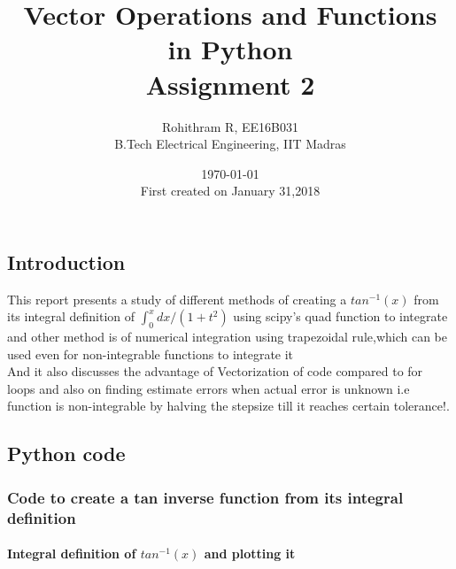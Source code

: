 \documentclass[a4paper]{report}
\title{Vector Operations and Functions in Python \\ Assignment 2}
\author{Rohithram R, EE16B031 \\ B.Tech Electrical Engineering, IIT Madras}
\date{\today \\ First created on January 31,2018}
\begin{document}
    
    
    \maketitle
    \chapter{}
	\section{Introduction}
	This report presents a study of different methods of creating a  $tan^{-1}(x)$ from its integral definition of $\int_{0}^{x} dx/(1+t^{2})$ using scipy's quad function to integrate and other method is of numerical integration using trapezoidal rule,which can be used even for non-integrable functions to integrate it \\
	And it also discusses the advantage of Vectorization of code compared to for loops and also on finding estimate errors when actual error is unknown i.e function is non-integrable by halving the stepsize till it reaches certain tolerance!.

    \section{Python code}
    \subsection{Code to create a tan inverse function from its integral definition}
    \subsubsection{Integral definition of  $tan^{-1}(x)$ and plotting it}
    
\end{document}
